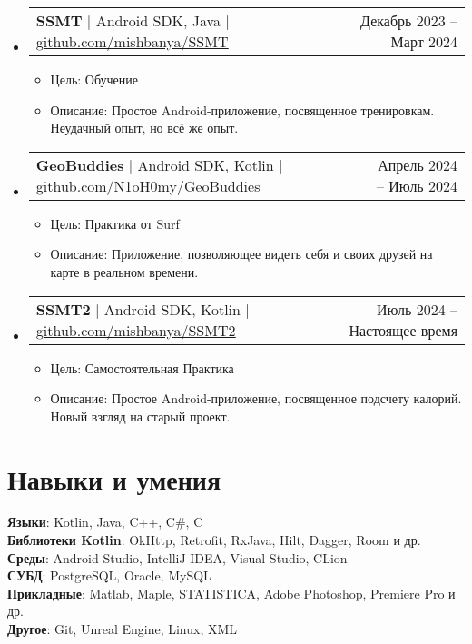 \documentclass[letterpaper,11pt]{article}
\makeatletter
\newcommand{\resumeItem}[1]{
  \item\small{
    {#1 \vspace{-2pt}}
  }
}
\newcommand{\resumeProjectHeading}[2]{
    \item
    \begin{tabular*}{0.97\textwidth}{l@{\extracolsep{\fill}}r}
      \small#1 & #2 \\
    \end{tabular*}\vspace{-7pt}
}
\newcommand{\resumeSubHeadingListStart}{\begin{itemize}[leftmargin=0.15in, label={}]}
\newcommand{\resumeSubHeadingListEnd}{\end{itemize}}
\newcommand{\resumeItemListStart}{\begin{itemize}}
\newcommand{\resumeItemListEnd}{\end{itemize}\vspace{-5pt}}
\makeatother
\begin{document}
    \resumeSubHeadingListStart
      \resumeProjectHeading
          {\textbf{SSMT} $|$ {Android SDK, Java | \href{https://github.com/mishbanya/SSMT}{\underline{github.com/mishbanya/SSMT}}}}{Декабрь 2023 -- Март 2024}
          \resumeItemListStart
            \resumeItem{Цель: Обучение}
            \resumeItem{Описание: Простое Android-приложение, посвященное тренировкам. Неудачный опыт, но всё же опыт.}
          \resumeItemListEnd
    \resumeSubHeadingListEnd
    \resumeSubHeadingListStart
      \resumeProjectHeading
          {\textbf{GeoBuddies} $|$ {Android SDK, Kotlin | \href{https://github.com/mishbanya/SSMT}{\underline{github.com/N1oH0my/GeoBuddies}}}}{Апрель 2024 -- Июль 2024}
          \resumeItemListStart
            \resumeItem{Цель: Практика от Surf}
            \resumeItem{Описание: Приложение, позволяющее видеть себя и своих друзей на карте в реальном времени.}
          \resumeItemListEnd
    \resumeSubHeadingListEnd
    \resumeSubHeadingListStart
      \resumeProjectHeading
          {\textbf{SSMT2} $|$ {Android SDK, Kotlin | \href{https://github.com/mishbanya/SSMT}{\underline{github.com/mishbanya/SSMT2}}}}{Июль 2024 -- Настоящее время}
          \resumeItemListStart
            \resumeItem{Цель: Самостоятельная Практика}
            \resumeItem{Описание: Простое Android-приложение, посвященное подсчету калорий. Новый взгляд на старый проект.}
          \resumeItemListEnd
    \resumeSubHeadingListEnd

\section{Навыки и умения}
 \begin{itemize}[leftmargin=0.15in, label={}]
    \small{\item{
     \textbf{Языки}{: Kotlin, Java, C++, C\#, C} \\
     \textbf{Библиотеки Kotlin}{: OkHttp, Retrofit, RxJava, Hilt, Dagger, Room и др.} \\
     \textbf{Среды}{: Android Studio, IntelliJ IDEA, Visual Studio, CLion} \\
     \textbf{СУБД}{: PostgreSQL, Oracle, MySQL} \\
     \textbf{Прикладные}{: Matlab, Maple, STATISTICA, Adobe Photoshop, Premiere Pro и др.} \\
     \textbf{Другое}{: Git, Unreal Engine, Linux, XML}
    }}
 \end{itemize}


\end{document}
